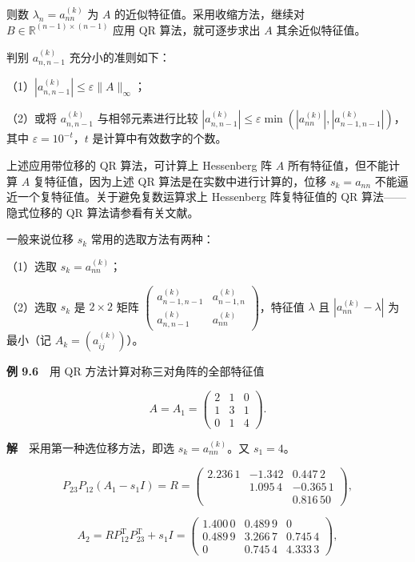 \documentclass[
  10pt,
  fontset=fandol]{ctexart}
\begin{document}
则数 \(\lambda_n=a_{nn}^{(k)}\) 为 \(A\) 的近似特征值。采用收缩方法，继续对 \(B\in\mathbb R^{(n-1)\times(n-1)}\) 应用 QR 算法，就可逐步求出 \(A\) 其余近似特征值。

判别 \(a_{n,n-1}^{(k)}\) 充分小的准则如下：

（1）\(|a_{n,n-1}^{(k)}|\leq\varepsilon\|A\|_\infty\)；

（2）或将 \(a_{n,n-1}^{(k)}\) 与相邻元素进行比较 \(|a_{n,n-1}^{(k)}|\leq\varepsilon\min(|a_{nn}^{(k)}|,|a_{n-1,n-1}^{(k)}|)\)，其中 \(\varepsilon=10^{-t}\)，\(t\) 是计算中有效数字的个数。

上述应用带位移的 QR 算法，可计算上 Hessenberg 阵 \(A\) 所有特征值，但不能计算 \(A\) 复特征值，因为上述 QR 算法是在实数中进行计算的，位移 \(s_k=a_{nn}\) 不能逼近一个复特征值。关于避免复数运算求上 Hessenberg 阵复特征值的 QR 算法------隐式位移的 QR 算法请参看有关文献。

一般来说位移 \(s_k\) 常用的选取方法有两种：

（1）选取 \(s_k=a_{nn}^{(k)}\)；

（2）选取 \(s_k\) 是 \(2\times2\) 矩阵 \(\begin{pmatrix}a_{n-1,n-1}^{(k)}&a_{n-1,n}^{(k)}\\a_{n,n-1}^{(k)}&a_{nn}^{(k)}\end{pmatrix}\)，特征值 \(\lambda\) 且 \(|a_{nn}^{(k)}-\lambda|\) 为最小（记 \(A_k=(a_{ij}^{(k)})\)）。

\textbf{例 9.6}　用 QR 方法计算对称三对角阵的全部特征值

\[
A=A_1=\begin{pmatrix}2&1&0\\1&3&1\\0&1&4\end{pmatrix}.
\]

\textbf{解}　采用第一种选位移方法，即选 \(s_k=a_{nn}^{(k)}\)。又 \(s_1=4\)。

\[
P_{23}P_{12}(A_1-s_1I)=R=\begin{pmatrix}
2.236\,1&-1.342&0.447\,2\\
&1.095\,4&-0.365\,1\\
&&0.816\,50
\end{pmatrix},
\]

\[
A_2=RP_{12}^{\mathrm T}P_{23}^{\mathrm T}+s_1I
=\begin{pmatrix}
1.400\,0&0.489\,9&0\\
0.489\,9&3.266\,7&0.745\,4\\
0&0.745\,4&4.333\,3
\end{pmatrix},
\]
\end{document}
